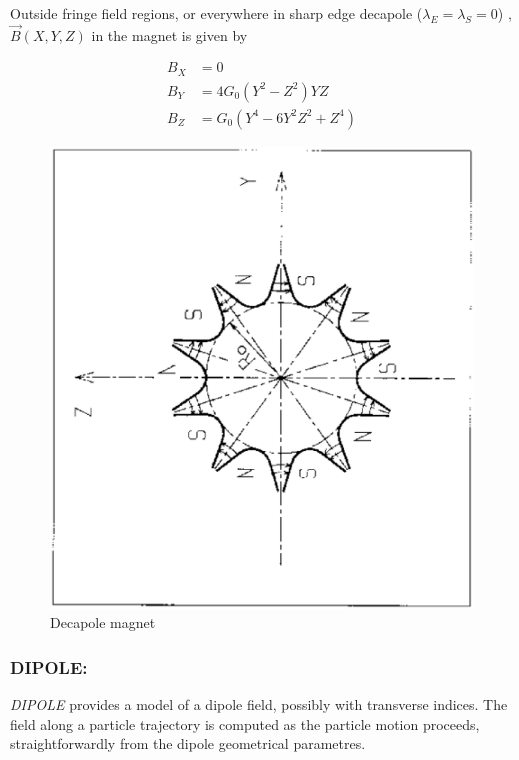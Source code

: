 \noindent Outside fringe field regions, or everywhere in sharp edge decapole 
($ \lambda_ E=\lambda_ S=0$) , $ \vec  B(X,Y,Z) $ in the magnet is given by 

\begin{align*}
	B_X &   =    0 \\
	B_Y &   =   4G_0(Y^2-Z^2)YZ \\
	B_Z &   =    G_0(Y^4-6Y^2Z^2+Z^4)
\end{align*}
\vfill

\begin{figure}[H]
\centerline{\includegraphics[width=12cm,angle=-90]{Fig18.ps}}
\caption{\label{fig18}Decapole magnet}
\end{figure}
\vfill








\newpage

\subsubsection*{DIPOLE: \DIPOLETitl} \label{DIPOLE} 
\medskip

\noindent\textsl{DIPOLE} provides a model of a dipole field, possibly with transverse indices. 
 The field along a particle trajectory is computed as the 
particle motion proceeds, straightforwardly from the dipole geometrical parametres. 

